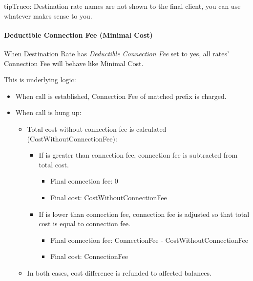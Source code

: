 \documentclass[letterpaper,10pt,spanish]{sphinxmanual}
\begin{document}
\begin{notice}{tip}{Truco:}
Destination rate names are not shown to the final client, you can use whatever makes sense to you.
\end{notice}


\paragraph{Deductible Connection Fee (Minimal Cost)}
\label{administration_portal/brand/billing/destination_rates:deductible-connection-fee-minimal-cost}
When Destination Rate has \emph{Deductible Connection Fee} set to yes, all rates' Connection Fee will behave like Minimal Cost.

This is underlying logic:
\begin{itemize}
\item {} 
When call is established, Connection Fee of matched prefix is charged.

\item {} 
When call is hung up:
\begin{itemize}
\item {} 
Total cost without connection fee is calculated (CostWithoutConnectionFee):
\begin{itemize}
\item {} 
If is greater than connection fee, connection fee is subtracted from total cost.
\begin{itemize}
\item {} 
Final connection fee: 0

\item {} 
Final cost: CostWithoutConnectionFee

\end{itemize}

\item {} 
If is lower than connection fee, connection fee is adjusted so that total cost is equal to connection fee.
\begin{itemize}
\item {} 
Final connection fee: ConnectionFee - CostWithoutConnectionFee

\item {} 
Final cost: ConnectionFee

\end{itemize}

\end{itemize}

\item {} 
In both cases, cost difference is refunded to affected balances.

\end{itemize}

\end{itemize}
\end{document}
